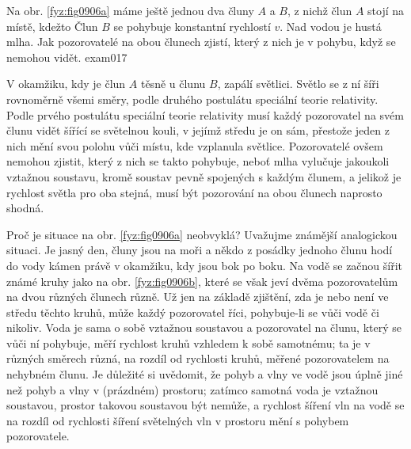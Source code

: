 \begin{fyzexam}{Na obr. \ref{fyz:fig0906a} máme ještě jednou dva čluny \(A\) a \(B\), z nichž člun
  \(A\) stojí na místě, kdežto Člun \(B\) se pohybuje konstantní rychlostí \(v\). Nad vodou je hustá
  mlha. Jak pozorovatelé na obou člunech zjistí, který z nich je v pohybu, když se nemohou vidět.
  \hfill\cite[s.~25]{Beiser1975}}{exam017} 
  
  V okamžiku, kdy je člun \(A\) těsně u člunu \(B\), zapálí světlici. Světlo se z ní šíři rovnoměrně
  všemi směry, podle druhého postulátu speciální teorie relativity. Podle prvého postulátu speciální
  teorie relativity musí každý pozorovatel na svém člunu vidět šířící se světelnou kouli, v jejímž
  středu je on sám, přestože jeden z nich mění svou polohu vůči místu, kde vzplanula světlice.
  Pozorovatelé ovšem nemohou zjistit, který z nich se takto pohybuje, neboť mlha vylučuje jakoukoli
  vztažnou soustavu, kromě soustav pevně spojených s každým člunem, a jelikož je rychlost světla pro
  oba stejná, musí být pozorování na obou člunech naprosto shodná.

    {\centering
    \captionsetup{type=figure}
    \par}
    \vspace{1em}

    Proč je situace na obr. \ref{fyz:fig0906a} neobvyklá? Uvažujme známější analogickou situaci. Je
    jasný den, čluny jsou na moři a někdo z posádky jednoho člunu hodí do vody kámen právě v
    okamžiku, kdy jsou bok po boku. Na vodě se začnou šířit známé kruhy jako na obr.
    \ref{fyz:fig0906b}, které se však jeví dvěma pozorovatelům na dvou různých člunech různě. Už jen
    na základě zjištění, zda je nebo není ve středu těchto kruhů, může každý pozorovatel říci,
    pohybuje-li se vůči vodě či nikoliv. Voda je sama o sobě vztažnou soustavou a pozorovatel na
    člunu, který se vůči ní pohybuje, měří rychlost kruhů vzhledem k sobě samotnému; ta je v různých
    směrech různá, na rozdíl od rychlosti kruhů, měřené pozorovatelem na nehybném člunu. Je důležité
    si uvědomit, že pohyb a vlny ve vodě jsou úplně jiné než pohyb a vlny v (prázdném) prostoru;
    zatímco samotná voda je vztažnou soustavou, prostor takovou soustavou být nemůže, a rychlost
    šíření vln na vodě se na rozdíl od rychlosti šíření světelných vln v prostoru mění s pohybem
    pozorovatele.

    {\centering
    \captionsetup{type=figure}
    \par}
    \vspace{1em}
  \end{fyzexam}